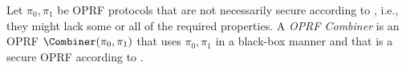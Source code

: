 


\begin{definition}
    Let $\pi_0,\pi_1$ be OPRF protocols that are not necessarily secure according to , i.e., they might lack some or all of the required properties. 
    A \emph{OPRF Combiner} is an OPRF $\Combiner(\pi_0,\pi_1)$ that uses $\pi_0,\pi_1$ in a black-box manner and that 
    is a secure OPRF according to .
\end{definition}

